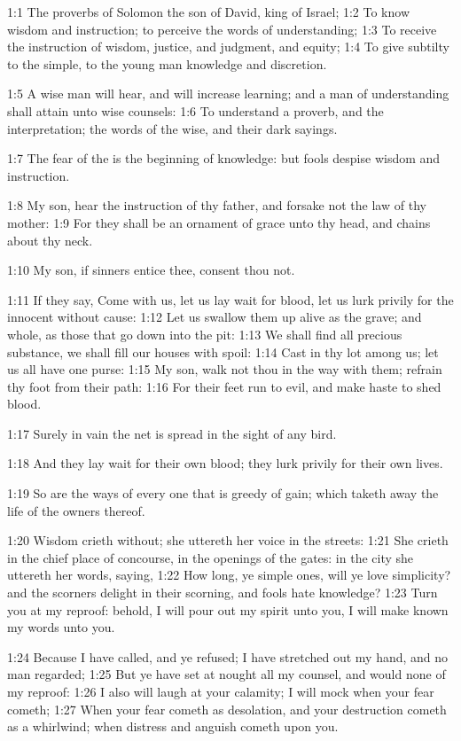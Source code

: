 

1:1 The proverbs of Solomon the son of David, king of Israel; 1:2 To
know wisdom and instruction; to perceive the words of understanding;
1:3 To receive the instruction of wisdom, justice, and judgment, and
equity; 1:4 To give subtilty to the simple, to the young man knowledge
and discretion.

1:5 A wise man will hear, and will increase learning; and a man of
understanding shall attain unto wise counsels: 1:6 To understand a
proverb, and the interpretation; the words of the wise, and their dark
sayings.

1:7 The fear of the \LORD is the beginning of knowledge: but fools
despise wisdom and instruction.

1:8 My son, hear the instruction of thy father, and forsake not the
law of thy mother: 1:9 For they shall be an ornament of grace unto thy
head, and chains about thy neck.

1:10 My son, if sinners entice thee, consent thou not.

1:11 If they say, Come with us, let us lay wait for blood, let us lurk
privily for the innocent without cause: 1:12 Let us swallow them up
alive as the grave; and whole, as those that go down into the pit:
1:13 We shall find all precious substance, we shall fill our houses
with spoil: 1:14 Cast in thy lot among us; let us all have one purse:
1:15 My son, walk not thou in the way with them; refrain thy foot from
their path: 1:16 For their feet run to evil, and make haste to shed
blood.

1:17 Surely in vain the net is spread in the sight of any bird.

1:18 And they lay wait for their own blood; they lurk privily for
their own lives.

1:19 So are the ways of every one that is greedy of gain; which taketh
away the life of the owners thereof.

1:20 Wisdom crieth without; she uttereth her voice in the streets:
1:21 She crieth in the chief place of concourse, in the openings of
the gates: in the city she uttereth her words, saying, 1:22 How long,
ye simple ones, will ye love simplicity? and the scorners delight in
their scorning, and fools hate knowledge?  1:23 Turn you at my
reproof: behold, I will pour out my spirit unto you, I will make known
my words unto you.

1:24 Because I have called, and ye refused; I have stretched out my
hand, and no man regarded; 1:25 But ye have set at nought all my
counsel, and would none of my reproof: 1:26 I also will laugh at your
calamity; I will mock when your fear cometh; 1:27 When your fear
cometh as desolation, and your destruction cometh as a whirlwind; when
distress and anguish cometh upon you.

